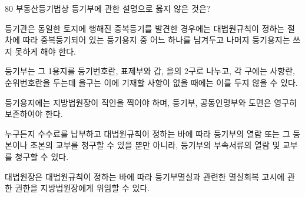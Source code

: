 \begin{question}{80}
부동산등기법상 등기부에 관한 설명으로 옳지 않은 것은?
\begin{choices}
  \item 등기관은 동일한 토지에 행해진 중복등기를 발견한 경우에는 대법원규칙이 정하는 절차에 따라 중복등기되어 있는 등기용지 중 어느 하나를 남겨두고 나머지 등기용지는 쓰지 못하게 해야 한다.
  \item 등기부는 그 1용지를 등기번호란, 표제부와 갑, 을의 2구로 나누고, 각 구에는 사항란, 순위번호란을 두는데 을구는 이에 기재할 사항이 없을 때에는 이를 두지 않을 수 있다.
  \item 등기용지에는 지방법원장이 직인을 찍어야 하며, 등기부, 공동인명부와 도면은 영구히 보존하여야 한다.
  \item 누구든지 수수료를 납부하고 대법원규칙이 정하는 바에 따라 등기부의 열람 또는 그 등본이나 초본의 교부를 청구할 수 있을 뿐만 아니라, 등기부의 부속서류의 열람 및 교부를 청구할 수 있다.
  \item 대법원장은 대법원규칙이 정하는 바에 따라 등기부멸실과 관련한 멸실회복 고시에 관한 권한을 지방법원장에게 위임할 수 있다.
\end{choices}
\end{question}
